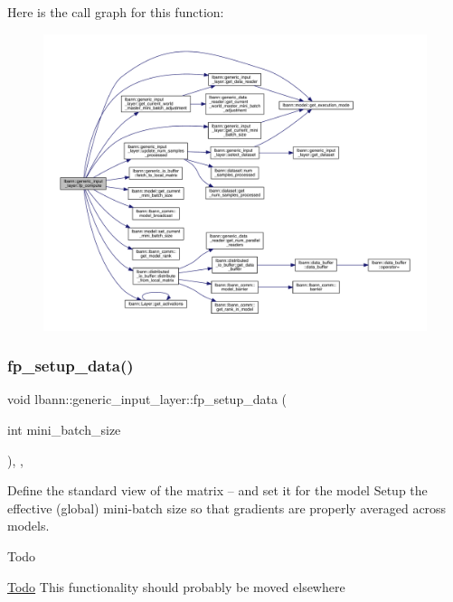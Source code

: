Here is the call graph for this function\+:\nopagebreak
\begin{figure}[H]
\begin{center}
\leavevmode
\includegraphics[width=350pt]{classlbann_1_1generic__input__layer_ae74c8c5a7e14b4fdd4902554bbc7bcef_cgraph}
\end{center}
\end{figure}
\mbox{\label{classlbann_1_1generic__input__layer_ad0b8ea79bc508bd227e08124359531c8}} 
\subsubsection{\texorpdfstring{fp\+\_\+setup\+\_\+data()}{fp\_setup\_data()}}
{\footnotesize\ttfamily void lbann\+::generic\+\_\+input\+\_\+layer\+::fp\+\_\+setup\+\_\+data (\begin{DoxyParamCaption}\item[{int}]{mini\+\_\+batch\+\_\+size }\end{DoxyParamCaption})\hspace{0.3cm}{\ttfamily [inline]}, {\ttfamily [override]}, {\ttfamily [virtual]}}

Define the standard view of the matrix -- and set it for the model Setup the effective (global) mini-\/batch size so that gradients are properly averaged across models. \begin{DoxyRefDesc}{Todo}
\item[\hyperlink{todo__todo000020}{Todo}]This functionality should probably be moved elsewhere \end{DoxyRefDesc}


